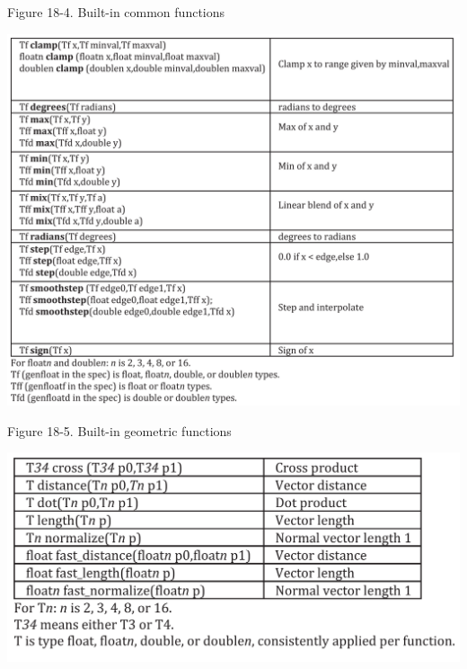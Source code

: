 \hspace*{\fill} \par %
Figure 18-4. Built-in common functions
\begin{center}
	\includegraphics[width=1.0\textwidth]{content/chapter-18/images/4}
\end{center}

\hspace*{\fill} \par %
Figure 18-5. Built-in geometric functions
\begin{center}
	\includegraphics[width=1.0\textwidth]{content/chapter-18/images/5}
\end{center}

